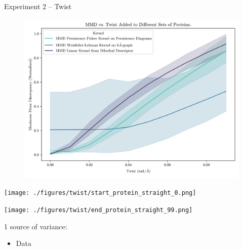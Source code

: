 \documentclass[aspectratio=169, 10pt, dvipsnames]{beamer}
\begin{document}
  {
\begin{frame}[fragile]{Experiment 2 -- Twist}
  \begin{minipage}{0.6\linewidth}
    \begin{figure}
      \centering
      \includegraphics[width=\textwidth]{./figures/twist.png}
    \end{figure}
    \centering
    \begin{minipage}{0.9\textwidth}
      \centering
      \begin{minipage}{0.05\textwidth}
        \texttt{[image: ./figures/twist/start\_protein\_straight\_0.png]}
      \end{minipage}
      \hfill
      \begin{minipage}{0.85\textwidth}
        \texttt{[image: ./figures/twist/end\_protein\_straight\_99.png]}
      \end{minipage}
      \hfill
      \begin{minipage}{0.05\textwidth}
      \end{minipage}
    \end{minipage}
  \end{minipage}
  \begin{minipage}{0.38\linewidth}

    \pause\small 1 source of variance:
    \begin{itemize}
      \pause\small\item Data
  \end{itemize}


\end{minipage}
\end{frame}}
\end{document}
